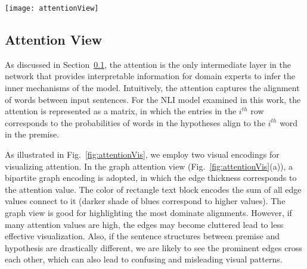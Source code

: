 \begin{figure*}[htbp]
\centering
\vspace{-2mm}
\texttt{[image: attentionView]}
\vspace{-6mm}
\caption{
Attention visualization. In the graph attention view (a), a bipartite graph encoding is adopted, in which the edge thickness corresponds to the attention value. In the matrix attention view (b), the entries of $i^{th}$ row represent the probabilities of words in hypotheses align to the $i^{th}$ word in the premise.
The user can alter the attention values via the pop-up interface illustrated in (c).
We overlay the dependency tree ($a_1$) grammar structure to highlight important words and simplify complex sentence to reduce clutter (d-e).
In (f), we show the difference between two attention matrix (the comparison feature is controlled by the buttons in the top left of all attention plots ($a_2$) ).
}
\label{fig:attentionVis}
\end{figure*}

\subsection{Attention View}
\label{sec:attention}
As discussed in Section~\ref{sec:attention}, the attention is the only intermediate layer in the network that provides interpretable information for domain experts to infer the inner mechanisms of the model.
%
Intuitively, the attention captures the alignment of words between input sentences. For the NLI model examined in this work, the attention is represented as a matrix, in which the entries in the $i^{th}$ row corresponds to the probabilities of words in the hypotheses align to the $i^{th}$ word in the premise.

As illustrated in Fig.~\ref{fig:attentionVis}, we employ two visual encodings for visualizing attention. In the graph attention view (Fig.~\ref{fig:attentionVis}(a)), a bipartite graph encoding is adopted, in which the edge thickness corresponds to the attention value. The color of rectangle text block encodes the sum of all edge values connect to it (darker shade of blues correspond to higher values).
%
The graph view is good for highlighting the most dominate alignments. However, if many attention values are high, the edges may become cluttered lead to less effective visualization. Also, if the sentence structures between premise and hypothesis are drastically different, we are likely to see the prominent edges cross each other, which can also lead to confusing and misleading visual patterns.

